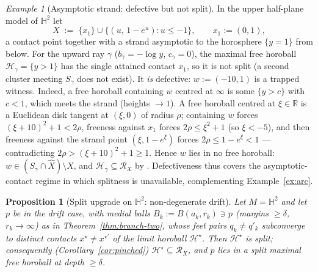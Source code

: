 \documentclass[11pt]{article}
\newtheorem{proposition}[theorem]{Proposition}
\theoremstyle{remark}
\newtheorem{example}[theorem]{Example}
\newcommand{\R}{\mathbb{R}}
\newcommand{\X}{X}
\newcommand{\Xhat}{\widehat{\X}}
\newcommand{\Rx}{\mathcal{R}_{\X}}
\newcommand{\Hb}[1]{\mathcal{H}_{#1}}
\newcommand{\Sb}[1]{S_{#1}}
\newcommand{\B}{B}
\begin{document}
\begin{example}[Asymptotic strand: defective but not split]
\label{ex:strand}
In the upper half-plane model of $\mathbb{H}^{2}$ let
\[
\X\;:=\;\{x_{1}\}\cup
\{(u,\,1-e^{u}) : u\le-1\},\qquad x_{1}:=(0,1),
\]
a contact point together with a strand asymptotic to the horosphere
$\{y=1\}$ from below. For the upward ray $\gamma$
($b_{\gamma}=-\log y$, $c_{\gamma}=0$), the maximal free horoball
$\Hb{\gamma}=\{y>1\}$ has the single attained contact $x_{1}$, so it
is not split (a second cluster meeting $\Sb{\gamma}$ does not exist).
It \emph{is} defective: $w:=(-10,1)$ is a trapped witness. Indeed, a
free horoball containing $w$ centred at $\infty$ is some
$\{y>c\}$ with $c<1$, which meets the strand (heights
$\to1$). A free horoball centred at $\xi\in\R$ is a Euclidean disk
tangent at $(\xi,0)$ of radius $\rho$; containing $w$ forces
$(\xi+10)^{2}+1<2\rho$, freeness against $x_{1}$ forces
$2\rho\le\xi^{2}+1$ (so $\xi<-5$), and then freeness against the
strand point $(\xi,1-e^{\xi})$ forces $2\rho\le1-e^{\xi}<1$ ---
contradicting $2\rho>(\xi+10)^{2}+1\ge1$. Hence $w$ lies in no free
horoball: $w\in(\Sb{\gamma}\cap\Xhat)\setminus\X$, and
$\Hb{\gamma}\subseteq\Rx$ by \cite[Thm.~4.1]{R1}. Defectiveness thus
covers the asymptotic-contact regime in which splitness is
unavailable, complementing Example~\ref{ex:arc}.
\end{example}

\begin{proposition}[Split upgrade on $\mathbb{H}^{2}$:
non-degenerate drift]\label{prop:h2-upgrade}
Let $M=\mathbb{H}^{2}$ and let $p$ be in the drift case, with medial
balls $B_{k}:=\B(a_{k},r_{k})\ni p$ (margins $\ge\delta$,
$r_{k}\to\infty$) as in Theorem~\ref{thm:branch-two}, whose feet
pairs $q_{k}\neq q'_{k}$ subconverge to \emph{distinct} contacts
$x^{\star}\neq x^{\star\prime}$ of the limit horoball
$\Hb{}^{\star}$. Then $\Hb{}^{\star}$ is split; consequently
(Corollary~\ref{cor:pinched}) $\Hb{}^{\star}\subseteq\Rx$, and $p$
lies in a split maximal free horoball at depth $\ge\delta$.
\end{proposition}
\end{document}
